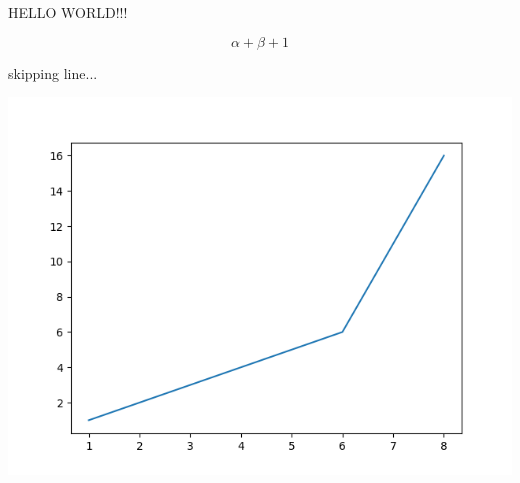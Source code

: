 \documentclass{article}
\begin{document}
HELLO WORLD!!!

\begin{equation}
	\alpha + \beta + 1
\end{equation}

skipping line...

\includegraphics[scale=0.65]{plot-data.png}
\end{document}

